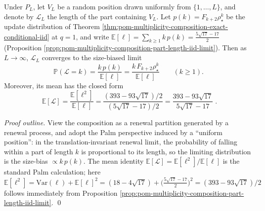 \begin{proposition}\label{prop:pom-multiplicity-composition-palm-size-bias}
Under \(P_L\), let \(V_L\) be a random position drawn uniformly from \(\{1,\dots,L\}\), and denote by \(\mathcal{L}_L\) the length of the part containing \(V_L\).
Let \(p(k)=F_{k+2}\rho_\star^k\) be the update distribution of Theorem \ref{thm:pom-multiplicity-composition-exact-conditional-iid} at \(q=1\), and write
\(
\mathbb{E}[\ell]=\sum_{k\ge 1}k\,p(k)=\frac{5\sqrt{17}-17}{2}
\) (Proposition \ref{prop:pom-multiplicity-composition-part-length-iid-limit}).
Then as \(L\to\infty\), \(\mathcal{L}_L\) converges to the size-biased limit
\begin{equation}\label{eq:pom-multiplicity-composition-palm-size-bias-law}
\boxed{\;
\mathbb{P}(\mathcal{L}=k)=\frac{k\,p(k)}{\mathbb{E}[\ell]}
=\frac{k\,F_{k+2}\rho_\star^k}{\mathbb{E}[\ell]}\qquad(k\ge 1).\;}
\end{equation}
Moreover, its mean has the closed form
\[
\boxed{\;
\mathbb{E}[\mathcal{L}]
=\frac{\mathbb{E}[\ell^2]}{\mathbb{E}[\ell]}
=\frac{(393-93\sqrt{17})/2}{(5\sqrt{17}-17)/2}
=\frac{393-93\sqrt{17}}{5\sqrt{17}-17}\; } .
\]
\end{proposition}
\begin{proof}[Proof outline]
View the composition as a renewal partition generated by a renewal process, and adopt the Palm perspective induced by a ``uniform position'':
in the translation-invariant renewal limit, the probability of falling within a part of length \(k\) is proportional to its length, so the limiting distribution is the size-bias \(\propto k\,p(k)\).
The mean identity \(\mathbb{E}[\mathcal{L}]=\mathbb{E}[\ell^2]/\mathbb{E}[\ell]\) is the standard Palm calculation;
here
\(
\mathbb{E}[\ell^2]=\mathrm{Var}(\ell)+\mathbb{E}[\ell]^2
=(18-4\sqrt{17})+\bigl(\frac{5\sqrt{17}-17}{2}\bigr)^2
=(393-93\sqrt{17})/2
\)
follows immediately from Proposition \ref{prop:pom-multiplicity-composition-part-length-iid-limit}. \qed
\end{proof}

